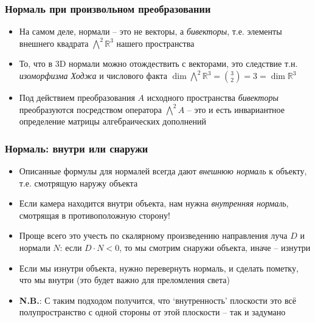 \documentclass[10pt]{beamer}
\begin{document}
\begin{frame}[fragile]
\frametitle{Нормаль при произвольном преобразовании}
\begin{itemize}
\item На самом деле, нормали -- это не векторы, а \textit{бивекторы}, т.е. элементы внешнего квадрата \begin{math}\bigwedge^2 \mathbb R^3\end{math} нашего пространства
\pause
\item То, что в 3D нормали можно отождествить с векторами, это следствие т.н. \textit{изоморфизма Ходжа} и числового факта \begin{math}\dim \bigwedge^2 \mathbb R^3 = \binom{3}{2} = 3 = \dim \mathbb R^3\end{math}
\pause
\item Под действием преобразования \begin{math}A\end{math} исходного пространства \textit{бивекторы} преобразуются посредством оператора \begin{math}\bigwedge^2 A\end{math} -- это и есть инвариантное определение матрицы алгебраических дополнений
\end{itemize}
\end{frame}

\begin{frame}[fragile]
\frametitle{Нормаль: внутри или снаружи}
\begin{itemize}
\item Описанные формулы для нормалей всегда дают \textit{внешнюю нормаль} к объекту, т.е. смотрящую наружу объекта
\pause
\item Если камера находится внутри объекта, нам нужна \textit{внутренняя нормаль}, смотрящая в противоположную сторону!
\pause
\item Проще всего это учесть по скалярному произведению направления луча \begin{math}D\end{math} и нормали \begin{math}N\end{math}: если \begin{math}D\cdot N < 0\end{math}, то мы смотрим снаружи объекта, иначе -- изнутри
\pause
\item Если мы изнутри объекта, нужно перевернуть нормаль, и сделать пометку, что мы внутри (это будет важно для преломления света)
\pause
\item \alert{\textbf{N.B.}}: С таким подходом получится, что `внутренность' плоскости это всё полупространство с одной стороны от этой плоскости -- так и задумано
\end{itemize}
\end{frame}
\end{document}
